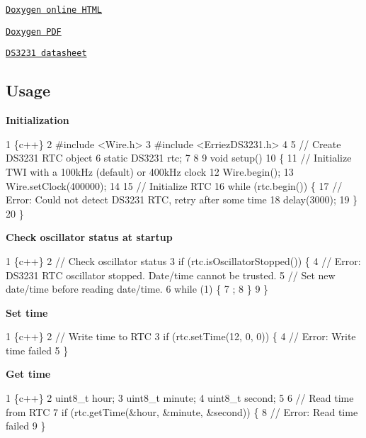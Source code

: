 \begin{DoxyItemize}
\item \href{https://erriez.github.io/ErriezDS3231}{\tt Doxygen online H\+T\+ML}
\item \href{https://github.com/Erriez/ErriezDS3231/raw/gh-pages/latex/ErriezDS3231.pdf}{\tt Doxygen P\+DF}
\item \href{https://github.com/Erriez/ErriezDS3231/blob/master/extras/DS3231.pdf}{\tt D\+S3231 datasheet}
\end{DoxyItemize}

\subsection*{Usage}

{\bfseries Initialization}


\begin{DoxyCode}
1 \{c++\}
2 #include <Wire.h>
3 #include <ErriezDS3231.h>
4 
5 // Create DS3231 RTC object
6 static DS3231 rtc;
7 
8 
9 void setup()
10 \{
11     // Initialize TWI with a 100kHz (default) or 400kHz clock
12     Wire.begin();
13     Wire.setClock(400000);
14 
15     // Initialize RTC
16     while (rtc.begin()) \{
17         // Error: Could not detect DS3231 RTC, retry after some time
18         delay(3000);
19     \}
20 \}
\end{DoxyCode}


{\bfseries Check oscillator status at startup}


\begin{DoxyCode}
1 \{c++\}
2 // Check oscillator status
3 if (rtc.isOscillatorStopped()) \{
4     // Error: DS3231 RTC oscillator stopped. Date/time cannot be trusted. 
5     // Set new date/time before reading date/time.
6     while (1) \{
7         ;
8     \}
9 \}
\end{DoxyCode}


{\bfseries Set time}


\begin{DoxyCode}
1 \{c++\}
2 // Write time to RTC
3 if (rtc.setTime(12, 0, 0)) \{
4     // Error: Write time failed
5 \}
\end{DoxyCode}


{\bfseries Get time}


\begin{DoxyCode}
1 \{c++\}
2 uint8\_t hour;
3 uint8\_t minute;
4 uint8\_t second;
5 
6 // Read time from RTC
7 if (rtc.getTime(&hour, &minute, &second)) \{
8     // Error: Read time failed
9 \}
\end{DoxyCode}


